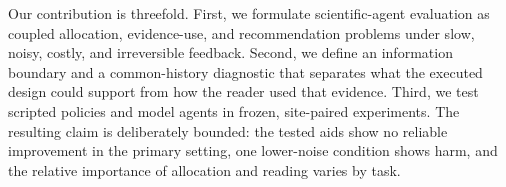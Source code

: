 Our contribution is threefold. First, we formulate scientific-agent evaluation as coupled
allocation, evidence-use, and recommendation problems under slow, noisy, costly, and
irreversible feedback. Second, we define an information boundary and a common-history
diagnostic that separates what the executed design could support from how the reader used
that evidence. Third, we test scripted policies and model agents in frozen, site-paired
experiments. The resulting claim is deliberately bounded: the tested aids show no reliable
improvement in the primary setting, one lower-noise condition shows harm, and the relative
importance of allocation and reading varies by task.
